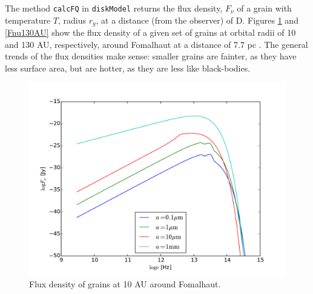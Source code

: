 \documentclass[12pt,preprint]{aastex}
\begin{document}
The method \texttt{calcFQ} in \texttt{diskModel} returns the flux density, $F_\nu$ of a grain with temperature $T$, radius $r_g$, at a distance (from the observer) of D. Figures \ref{fig:Fnu10AU} and \ref{Fnu130AU} show the flux density of a given set of grains at orbital radii of 10 and 130 AU, respectively, around Fomalhaut at a distance of 7.7 pc \cite{Fom}. The general trends of the flux densities make sense: smaller grains are fainter, as they have less surface area, but are hotter, as they are less like black-bodies. 


\begin{figure}[htbp]
\begin{center}
\includegraphics[width=\textwidth]{Fnu10AU.pdf}
    \caption{Flux density of grains at 10 AU around Fomalhaut.}
    \label{fig:Fnu10AU}
\end{center}
\end{figure}
\end{document}
